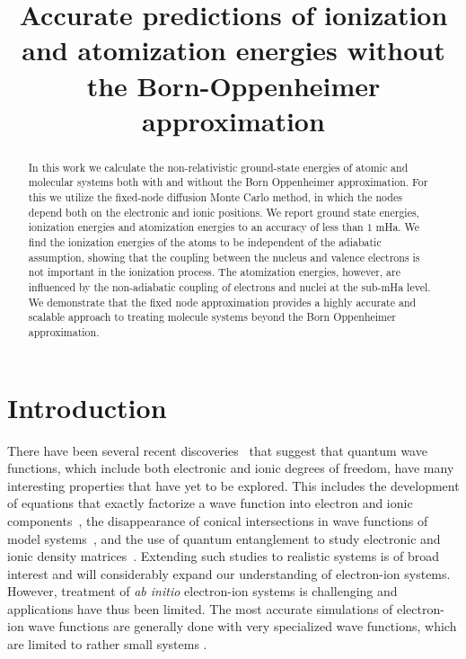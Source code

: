 \documentclass[pra,superscriptaddress,groupedaddress,twocolumn]{revtex4}
\begin{document}
\title{Accurate predictions of ionization and atomization energies without the Born-Oppenheimer approximation}

\begin{abstract}
In this work we calculate the non-relativistic ground-state energies of atomic and molecular systems both with and without the Born Oppenheimer approximation. For this we utilize the fixed-node diffusion Monte Carlo method, in which the nodes depend both on the electronic and ionic positions. We report ground state energies, ionization energies and atomization energies to an accuracy of less than $1$ mHa. We find the ionization energies of the atoms to be independent of the adiabatic assumption, showing that the coupling between the nucleus and valence electrons is not important in the ionization process. The atomization energies, however, are influenced by the non-adiabatic coupling of electrons and nuclei at the sub-mHa level. We demonstrate that the fixed node approximation provides a highly accurate and scalable approach to treating molecule systems beyond the Born Oppenheimer approximation.
\end{abstract}
\maketitle

\section{Introduction}
There have been several recent discoveries~\cite{cederbaum1,gross2014,boent} that suggest that quantum wave functions, which include both electronic and ionic degrees of freedom, have many interesting properties that have yet to be explored.  This includes the development of equations that exactly factorize a wave function into electron and ionic components~\cite{cederbaum1}, the disappearance of conical intersections in wave functions of model systems~\cite{gross2014}, and the use of quantum entanglement to study electronic and ionic density matrices~\cite{boent}.  Extending such studies to realistic systems is of broad interest and will considerably expand our understanding of electron-ion systems. However, treatment of \textit{ab initio} electron-ion systems is challenging and applications have thus been limited.   The most accurate simulations of electron-ion wave functions are generally done with very specialized wave functions, which are limited to rather small systems \cite{mitroy2013}.  
\end{document}
